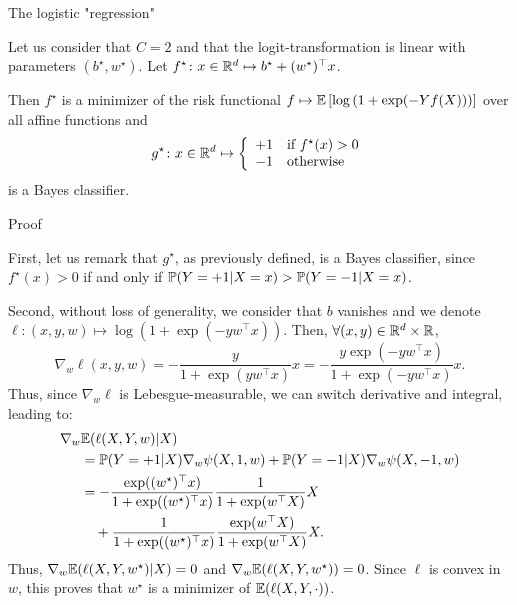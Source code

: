 \documentclass[xcolor={usenames,dvipsnames}]{beamer}
\begin{document}
\begin{frame}{The logistic "regression"}
\begin{theorem}
	Let us consider that $C=2$ and that the logit-transformation is linear with parameters $(b^\star, w^\star)$.
	Let $f^\star \colon x \in \R^d \mapsto b^\star + (w^\star) ^\top x$.

	Then $f^\star$ is a minimizer of the risk functional
	$f \mapsto \E \left[\log\left( 1 + \exp(-Yf(X)) \right) \right]$ over all affine functions and
	$$
		g^\star \colon x \in \R^d \mapsto
		\left\{ \begin{array}{ll}
			+1 & \text{if } f^\star(x) > 0 \\
			-1 & \text{otherwise}
		\end{array} \right.
	$$
	is a Bayes classifier.
\end{theorem}
\end{frame}

\begin{frame}[allowframebreaks]{Proof}

	First, let us remark that $g^\star$, as previously defined, is a Bayes classifier, since $f^\star(x) > 0$ if and only if $\P(Y=+1 | X=x) > \P(Y=-1 | X=x)$.

	Second, without loss of generality, we consider that $b$ vanishes and we denote $\ell \colon (x, y, w) \mapsto \log\left( 1 + \exp(-y w^\top x) \right)$.
	Then, $\forall (x, y) \in \R^d \times \R$,
	$$
		\nabla_{w}{\ell}(x, y, w)
		= - \frac{y}{1+\exp(y w^\top x)} x
		= - \frac{y \exp(-y w^\top x)}{1+\exp(-y w^\top x)} x.
	$$
	Thus, since $\nabla_{w}{\ell}$ is Lebesgue-measurable, we can switch derivative and integral, leading to:
	\begin{align*}
		\nabla_w & {\E(\ell(X, Y, w)|X)}\\
		&= \P(Y=+1 | X) \nabla_w{\psi}(X, 1, w) + \P(Y=-1 | X) \nabla_w{\psi}(X, -1, w) \\
		&= - \frac{\exp((w^\star)^\top x)}{1+\exp((w^\star)^\top x)} \frac{1}{1+\exp(w^\top X)} X \\
		&\quad +
		\frac{1}{1+\exp((w^\star)^\top x)} \frac{\exp(w^\top X)}{1+\exp(w^\top X)} X.
	\end{align*}
	Thus, $\nabla_{w}{\E(\ell(X, Y, w^\star)|X)} = 0$ and $\nabla_{w}{\E(\ell(X, Y, w^\star))} = 0$.
	Since $\ell$ is convex in $w$, this proves that $w^\star$ is a minimizer of $\E(\ell(X, Y, \cdot))$.
\end{frame}
\end{document}
